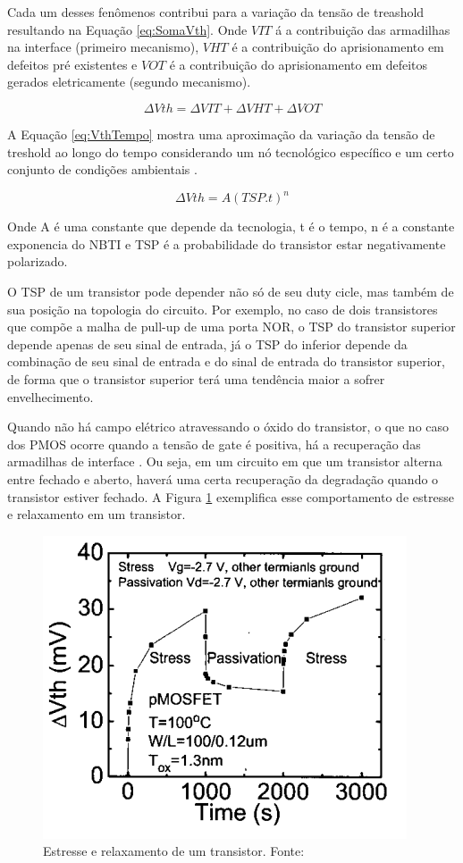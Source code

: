 Cada um desses fenômenos contribui para a variação da tensão de treashold resultando na Equação \ref{eq:SomaVth}. Onde $V\scriptstyle{IT}$ á a contribuição das armadilhas na interface (primeiro mecanismo), $V\scriptstyle{HT}$ é a contribuição do aprisionamento em defeitos pré existentes e $V\scriptstyle{OT}$ é a contribuição do aprisionamento em defeitos gerados eletricamente (segundo mecanismo).

\begin{equation}
    \label{eq:SomaVth}
    \Delta V{\scriptstyle {th}} = \Delta V{\scriptstyle {IT}} + \Delta V{\scriptstyle {HT}} + \Delta V{\scriptstyle {OT}}
\end{equation}

A Equação \ref{eq:VthTempo} mostra uma aproximação da variação da tensão de treshold ao longo do tempo considerando um nó tecnológico específico e um certo conjunto de condições ambientais \cite{Butzen}.

\begin{equation}
    \label{eq:VthTempo}
    \Delta Vth = A(TSP.t)^n
\end{equation}

Onde A é uma constante que depende da tecnologia, t é o tempo, n é a constante exponencia do NBTI e TSP é a probabilidade do transistor estar negativamente polarizado.

O TSP de um transistor pode depender não só de seu duty cicle, mas também de sua posição na topologia do circuito. Por exemplo, no caso de dois transistores que compõe a malha de pull-up de uma porta NOR, o TSP do transistor superior depende apenas de seu sinal de entrada, já o TSP do inferior depende da combinação de seu sinal de entrada e do sinal de entrada do transistor superior, de forma que o transistor superior terá uma tendência maior a sofrer envelhecimento.

Quando não há campo elétrico atravessando o óxido do transistor, o que no caso dos PMOS ocorre quando a tensão de gate é positiva, há a recuperação das armadilhas de interface \cite{Chen}. Ou seja, em um circuito em que um transistor alterna entre fechado e aberto, haverá uma certa recuperação da degradação quando o transistor estiver fechado. A Figura \ref{fig:recover} exemplifica esse comportamento de estresse e relaxamento em um transistor.

\begin{figure}[H]
    \centering
    \includegraphics[scale=0.8]{figures/ReferencialTeorico/Recover.png}
    \caption{Estresse e relaxamento de um transistor. Fonte: \cite{Chen}}
    \label{fig:recover}
\end{figure}
